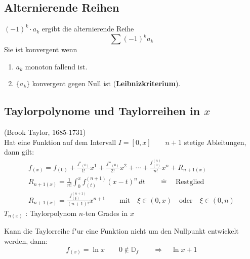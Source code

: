 \subsection{Alternierende Reihen}
$(-1)^k\cdot a_k$ ergibt die alternierende Reihe
\begin{equation}
  \sum (-1)^k a_k
\end{equation}
Sie ist konvergent wenn
\begin{enumerate}
  \item $a_k$ monoton fallend ist.
  \item $\{a_k\}$ konvergent gegen Null ist (\textbf{Leibnizkriterium}).
\end{enumerate}


\subsection{Taylorpolynome und Taylorreihen in $x$}
(Brook Taylor, 1685-1731) \\

Hat eine Funktion auf dem Intervall $I=[0, x]\qquad n+1$ stetige Ableitungen, dann gilt:
\begin{gather}
  f_{(x)} = f_{(0)} + \frac{f'_{(0)}}{1!}x^1 + \frac{f''_{(0)}}{2!}x^2 + \cdots + \frac{f^{(n)}_{(0)}}{n!}x^n + R_{n+1 (x)} \\
  R_{n+1 (x)} = \frac{1}{n!}\int_0^x f^{(n+1)}_{(t)}(x-t)^n\,dt \qquad\hat{=}\quad\text{Restglied} \\
  R_{n+1 (x)} = \frac{f^{(n+1)}_{(\xi)}}{(n+1)!}x^{n+1} \qquad\text{mit}\quad\xi\in (0,x)\quad\text{oder}\quad\xi\in (0,n)
\end{gather}
$T_{n(x)}$ : Taylorpolynom $n$-ten Grades in $x$

Kann die Taylorreihe f"ur eine Funktion nicht um den Nullpunkt entwickelt werden, dann:
\begin{equation}
  f_{(x)} = \ln{x} \qquad 0 \notin\mathbb{D}_f \qquad\Longrightarrow\quad\ln{x+1}
\end{equation}

